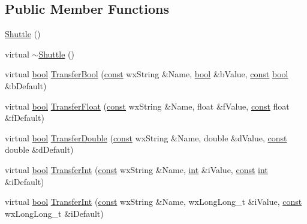 \subsection*{Public Member Functions}
\begin{DoxyCompactItemize}
\item 
\hyperlink{class_shuttle_a2866eb317e8478ac9d54e6eecba17238}{Shuttle} ()
\item 
virtual \hyperlink{class_shuttle_af6f5378d0e3a0fc0ee1481fbbb33cc4e}{$\sim$\+Shuttle} ()
\item 
virtual \hyperlink{mac_2config_2i386_2lib-src_2libsoxr_2soxr-config_8h_abb452686968e48b67397da5f97445f5b}{bool} \hyperlink{class_shuttle_a1bb8792f27bcb827295d265eb34f2613}{Transfer\+Bool} (\hyperlink{getopt1_8c_a2c212835823e3c54a8ab6d95c652660e}{const} wx\+String \&Name, \hyperlink{mac_2config_2i386_2lib-src_2libsoxr_2soxr-config_8h_abb452686968e48b67397da5f97445f5b}{bool} \&b\+Value, \hyperlink{getopt1_8c_a2c212835823e3c54a8ab6d95c652660e}{const} \hyperlink{mac_2config_2i386_2lib-src_2libsoxr_2soxr-config_8h_abb452686968e48b67397da5f97445f5b}{bool} \&b\+Default)
\item 
virtual \hyperlink{mac_2config_2i386_2lib-src_2libsoxr_2soxr-config_8h_abb452686968e48b67397da5f97445f5b}{bool} \hyperlink{class_shuttle_aa9d8877cf3b407b6cfc051554a5b9f8f}{Transfer\+Float} (\hyperlink{getopt1_8c_a2c212835823e3c54a8ab6d95c652660e}{const} wx\+String \&Name, float \&f\+Value, \hyperlink{getopt1_8c_a2c212835823e3c54a8ab6d95c652660e}{const} float \&f\+Default)
\item 
virtual \hyperlink{mac_2config_2i386_2lib-src_2libsoxr_2soxr-config_8h_abb452686968e48b67397da5f97445f5b}{bool} \hyperlink{class_shuttle_a2e76aa9a845182944dea18146c7a2eef}{Transfer\+Double} (\hyperlink{getopt1_8c_a2c212835823e3c54a8ab6d95c652660e}{const} wx\+String \&Name, double \&d\+Value, \hyperlink{getopt1_8c_a2c212835823e3c54a8ab6d95c652660e}{const} double \&d\+Default)
\item 
virtual \hyperlink{mac_2config_2i386_2lib-src_2libsoxr_2soxr-config_8h_abb452686968e48b67397da5f97445f5b}{bool} \hyperlink{class_shuttle_ac127a0909284bf2a609a7be4f2b089e1}{Transfer\+Int} (\hyperlink{getopt1_8c_a2c212835823e3c54a8ab6d95c652660e}{const} wx\+String \&Name, \hyperlink{xmltok_8h_a5a0d4a5641ce434f1d23533f2b2e6653}{int} \&i\+Value, \hyperlink{getopt1_8c_a2c212835823e3c54a8ab6d95c652660e}{const} \hyperlink{xmltok_8h_a5a0d4a5641ce434f1d23533f2b2e6653}{int} \&i\+Default)
\item 
virtual \hyperlink{mac_2config_2i386_2lib-src_2libsoxr_2soxr-config_8h_abb452686968e48b67397da5f97445f5b}{bool} \hyperlink{class_shuttle_ad7cdac9ff57c201ba474d17de24242cf}{Transfer\+Int} (\hyperlink{getopt1_8c_a2c212835823e3c54a8ab6d95c652660e}{const} wx\+String \&Name, wx\+Long\+Long\+\_\+t \&i\+Value, \hyperlink{getopt1_8c_a2c212835823e3c54a8ab6d95c652660e}{const} wx\+Long\+Long\+\_\+t \&i\+Default)

\end{DoxyCompactItemize}
